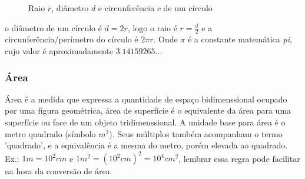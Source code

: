 \begin{multicols*}{2}
    \begin{figure}[H]
        \centering
        \caption{Raio $r$, diâmetro $d$ e circunferência $c$ de um círculo}
    \end{figure}

    o diâmetro de um círculo é $d = 2r$, logo o raio é $r = \frac{d}{2}$ e a circunferência/perímetro do círculo é $2\pi r$.
    Onde $\pi$ é a constante matemática \textit{pi}, cujo valor é aproximadamente $3.14159265...$


    \subsubsection*{Área}
    Área é a medida que expressa a quantidade de espaço bidimenssional ocupado por uma fígura geométrica,
    área de superfície é o equivalente da área para uma superfície ou face de um objeto tridimenssional. A unidade base
    para área é o metro quadrado (símbolo ${m^2}$). Seus múltiplos também acompanham o termo 'quadrado',
    e a equivalência é a mesma do metro, porém elevada ao quadrado. Ex.: $1m = 10^2cm$ e $1m^2 = (10^2cm)^2 = 10^4cm^2$,
    lembrar essa regra pode facilitar na hora da conversão de área.


\end{multicols*}
